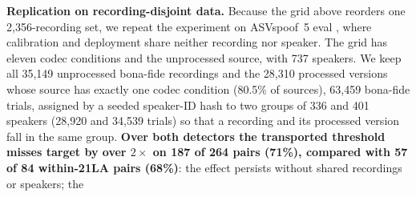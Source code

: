 \documentclass{article}
\begin{document}
\textbf{Replication on recording-disjoint data.} Because the grid above reorders one 2,356-recording set, we repeat the experiment on ASVspoof~5 eval \cite{asvspoof5}, where calibration and deployment share neither recording nor speaker. The grid has eleven codec conditions and the unprocessed source, with 737 speakers. We keep all 35,149 unprocessed bona-fide recordings and the 28,310 processed versions whose source has exactly one codec condition (80.5\% of sources), 63,459 bona-fide trials, assigned by a seeded speaker-ID hash to two groups of 336 and 401 speakers (28,920 and 34,539 trials) so that a recording and its processed version fall in the same group. \textbf{Over both detectors the transported threshold
misses target by over $2\times$ on 187 of 264 pairs (71\%), compared with 57 of 84 within-21LA pairs (68\%)}: the effect persists without shared recordings or speakers; the
\end{document}
